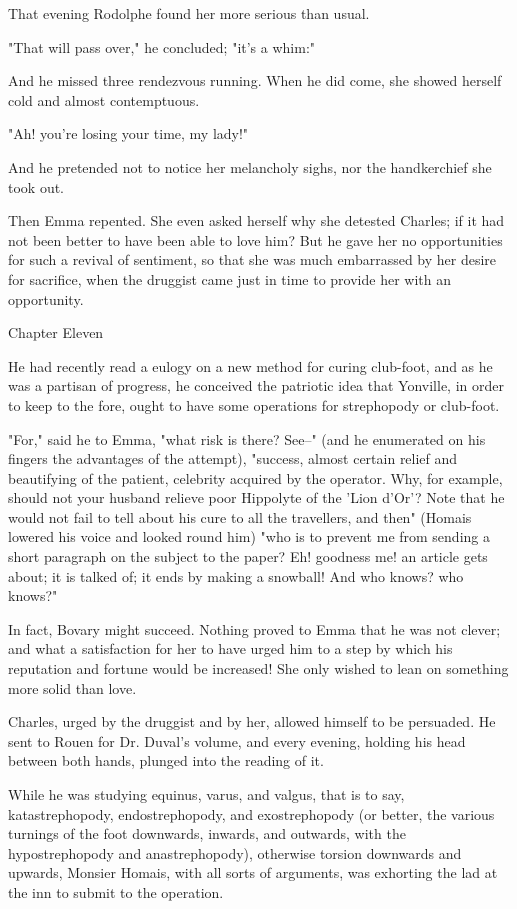 \documentclass{tufte-book}
\begin{document}
That evening Rodolphe found her more serious than usual.

"That will pass over," he concluded; "it's a whim:"

And he missed three rendezvous running. When he did come, she showed
herself cold and almost contemptuous.

"Ah! you're losing your time, my lady!"

And he pretended not to notice her melancholy sighs, nor the
handkerchief she took out.

Then Emma repented. She even asked herself why she detested Charles; if
it had not been better to have been able to love him? But he gave her
no opportunities for such a revival of sentiment, so that she was much
embarrassed by her desire for sacrifice, when the druggist came just in
time to provide her with an opportunity.



Chapter Eleven

He had recently read a eulogy on a new method for curing club-foot, and
as he was a partisan of progress, he conceived the patriotic idea that
Yonville, in order to keep to the fore, ought to have some operations
for strephopody or club-foot.

"For," said he to Emma, "what risk is there? See--" (and he enumerated
on his fingers the advantages of the attempt), "success, almost certain
relief and beautifying of the patient, celebrity acquired by the
operator. Why, for example, should not your husband relieve poor
Hippolyte of the 'Lion d'Or'? Note that he would not fail to tell about
his cure to all the travellers, and then" (Homais lowered his voice and
looked round him) "who is to prevent me from sending a short paragraph
on the subject to the paper? Eh! goodness me! an article gets about; it
is talked of; it ends by making a snowball! And who knows? who knows?"

In fact, Bovary might succeed. Nothing proved to Emma that he was not
clever; and what a satisfaction for her to have urged him to a step by
which his reputation and fortune would be increased! She only wished to
lean on something more solid than love.

Charles, urged by the druggist and by her, allowed himself to be
persuaded. He sent to Rouen for Dr. Duval's volume, and every evening,
holding his head between both hands, plunged into the reading of it.

While he was studying equinus, varus, and valgus, that is to say,
katastrephopody, endostrephopody, and exostrephopody (or better, the
various turnings of the foot downwards, inwards, and outwards, with the
hypostrephopody and anastrephopody), otherwise torsion downwards and
upwards, Monsier Homais, with all sorts of arguments, was exhorting the
lad at the inn to submit to the operation.
\end{document}
